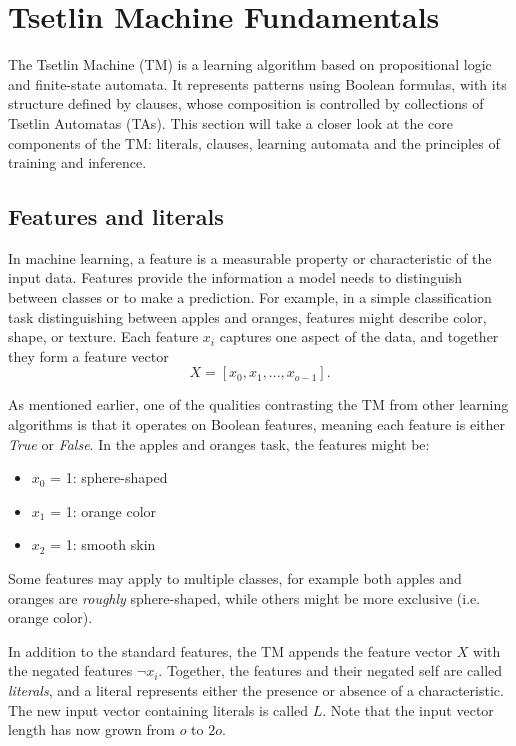 


\section{Tsetlin Machine Fundamentals}
\label{sec:tmtheory}
The Tsetlin Machine (TM) is a learning algorithm based on propositional logic and finite-state automata. It represents patterns using Boolean formulas, with its structure defined by clauses, whose composition is controlled by collections of Tsetlin Automatas (TAs). This section will take a closer look at the core components of the TM: literals, clauses, learning automata and the principles of training and inference.

\subsection{Features and literals}
In machine learning, a feature is a measurable property or characteristic of the input data. Features provide the information a model needs to distinguish between classes or to make a prediction. For example, in a simple classification task distinguishing between apples and oranges, features might describe color, shape, or texture. Each feature $x_i$ captures one aspect of the data, and together they form a feature vector
\begin{equation}
\label{eq:featvec}
    X = [x_0,x_1,...,x_{o-1}].
\end{equation}

As mentioned earlier, one of the qualities contrasting the TM from other learning algorithms is that it operates on Boolean features, meaning each feature is either \textit{True} or \textit{False}. In the apples and oranges task, the features might be:

\begin{itemize}
    \item $x_0$ = 1: sphere-shaped
    \item $x_1$ = 1: orange color
    \item $x_2$ = 1: smooth skin
\end{itemize}

Some features may apply to multiple classes, for example both apples and oranges are \textit{roughly} sphere-shaped, while others might be more exclusive (i.e. orange color).

In addition to the standard features, the TM appends the feature vector $X$ with the negated features $\neg x_i$. Together, the features and their negated self are called \textit{literals}, and a literal represents either the presence or absence of a characteristic. The new input vector containing literals is called $L$. Note that the input vector length has now grown from $o$ to $2o$.

